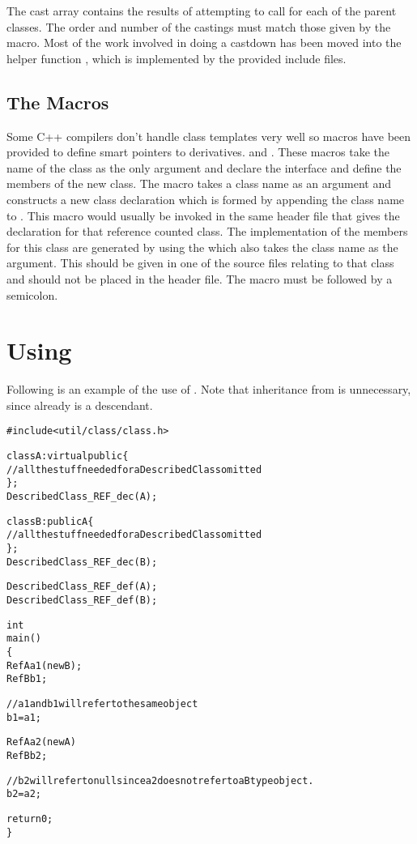 The cast array contains the results of attempting to call
 for each of the parent classes.  The order and
number of the castings must match those given by the 
macro.  Most of the work involved in doing a castdown has been
moved into the helper function , which is
implemented by the provided include files.



\subsection{The  Macros}

Some C++ compilers don't handle class templates very well so
 macros have been provided to define smart
pointers to  derivatives.
 and .  These macros take the
name of the  class as the only
argument and declare the interface and define the members of
the new  class.  The
 macro takes a class name as
an argument and constructs a new class declaration which is
formed by appending the class name to .  This
macro would usually be invoked in the same header file that
gives the declaration for that reference counted class.  The
implementation of the members for this class are generated
by using the  which also
takes the class name as the argument.  This should be given
in one of the source files relating to that class and should
not be placed in the header file.  The
 macro must be followed by a
semicolon.

\section{Using }

Following is an example of the use of .
Note that inheritance from 
is unnecessary, since  already is a
 descendant.

\begin{alltt}
#include <util/class/class.h>

class A: virtual public  \{
 // all the stuff needed for a DescribedClass omitted
\};
DescribedClass_REF_dec(A);

class B: public A \{
 // all the stuff needed for a DescribedClass omitted
\};
DescribedClass_REF_dec(B);

DescribedClass_REF_def(A);
DescribedClass_REF_def(B);

int
main()
\{
  RefA a1(new B);
  RefB b1;

  // a1 and b1 will refer to the same object
  b1 = a1;

  RefA a2(new A)
  RefB b2;

  // b2 will refer to null since a2 does not refer to a B type object.
  b2 = a2;

  return 0;
\}

\end{alltt}
